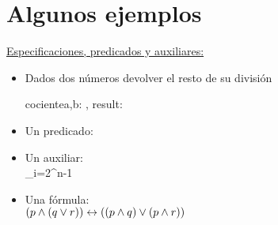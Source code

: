\documentclass[../blank_project_dc.tex]{subfiles}
\begin{document}
\section{ Algunos ejemplos }

\ul{Especificaciones, predicados y auxiliares:}\cite{knuth:1984}

\begin{itemize}
    \item Dados dos números devolver el resto de su división
    
    \begin{proc}{cociente}{\In a,b: \ent, \Out result: \ent}{}
    \end{proc}
    
    \item Un predicado: \\

    
    \item Un auxiliar: \\

    {\sum_{i=2}^{n-1}}
    
    \item Una fórmula: \\
    $(p \land (q \lor r)) \leftrightarrow ((p \land q) \lor (p \land r))$
    
     
\end{itemize}
\end{document}
